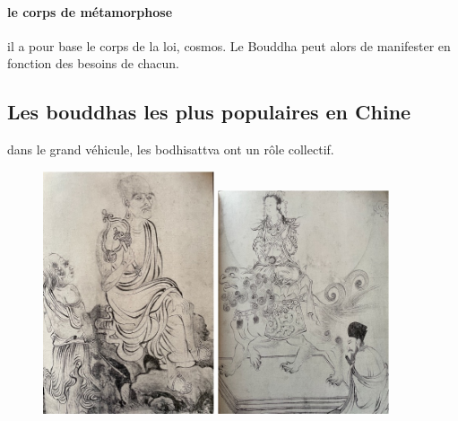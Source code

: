 \paragraph{le corps de métamorphose} il a pour base le corps de la loi, cosmos. Le Bouddha peut alors de manifester en fonction des besoins de chacun. 

\subsection{Les bouddhas les plus populaires en Chine}

\begin{Prop}
    dans le grand véhicule, les bodhisattva ont un rôle collectif.
\end{Prop}

\begin{figure}
    \centering
    \includegraphics[width=0.45\textwidth]{ConfucianismeTaoismeBouddhismeChinois/Images/Arhat.jpg}
    \includegraphics[width=0.45\textwidth]{ConfucianismeTaoismeBouddhismeChinois/Images/Bodhisattva.jpg}
  
    \label{fig:enter-label}
\end{figure}

